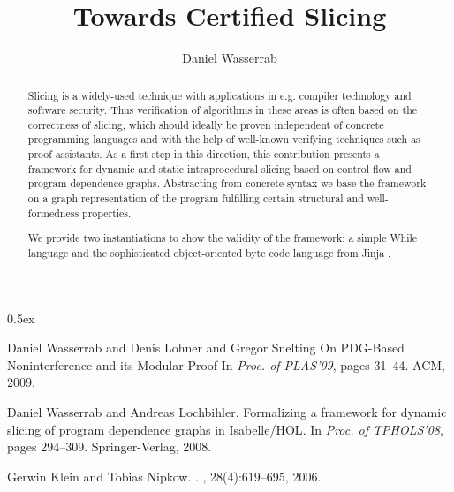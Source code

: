 \documentclass[11pt,a4paper,notitlepage]{report}
\begin{document}
\title{Towards Certified Slicing}
\author{Daniel Wasserrab}
\maketitle

\begin{abstract}
Slicing is a widely-used technique with applications in e.g. compiler
technology and software security. Thus verification of
algorithms in these areas is often based on the correctness of slicing,
which should ideally be proven independent of concrete programming
languages and with the help of well-known verifying techniques such as
proof assistants. As a first step in this direction, this contribution
presents a framework for dynamic \cite{WasserrabL:08} 
and static intraprocedural slicing \cite{WasserrabLS:09}
based on control flow and program dependence graphs.
Abstracting from concrete syntax we base the framework on a graph
representation of the program fulfilling certain structural
and well-formedness properties.

We provide two instantiations to show the validity of the framework:
a simple While language and the sophisticated object-oriented byte code
language from Jinja \cite{KleinN:06}. 
\end{abstract}

\parindent 0pt\parskip 0.5ex



%
%
\begin{thebibliography}{10}

Daniel Wasserrab and Denis Lohner and Gregor Snelting
\newblock On PDG-Based Noninterference and its Modular Proof
\newblock In {\em Proc. of PLAS'09}, pages 31--44. ACM, 2009.

Daniel Wasserrab and Andreas Lochbihler.
\newblock Formalizing a framework for dynamic slicing of program dependence
  graphs in {Isabelle/HOL}.
\newblock In {\em Proc. of TPHOLS'08}, pages 294--309. Springer-Verlag, 2008.

Gerwin Klein and Tobias Nipkow.
.
,
  28(4):619--695, 2006.

\end{thebibliography}
\end{document}
